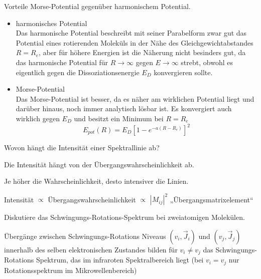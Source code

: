 \documentclass[a5paper,12pt,ngerman,grid=front %
,print
]{kartei}
\begin{document}
	\begin{karte}{
		Vorteile Morse-Potential gegenüber harmonischem Potential.
		}
		
		\begin{itemize}
			\item harmonisches Potential \\
				Das harmonische Potential beschreibt mit seiner Parabelform zwar gut das Potential eines rotierenden Moleküls in der Nähe des Gleichgewichtabstandes $R=R_e$, aber für höhere Energien ist die Näherung nicht besinders gut, da das harmonische Potential für $R \rightarrow \infty$ gegen $ E \rightarrow \infty $ strebt, obwohl es eigentlich gegen die Dissoziationsenergie $E_D$ konvergieren sollte.
				
			\item Morse-Potential \\
				Das Morse-Potential ist besser, da es näher am wirklichen Potential liegt und darüber hinaus, noch immer analytisch lösbar ist. Es konvergiert auch wirklich gegen $E_D$ und besitzt ein Minimum bei $R=R_e$
				$$ E_{pot}(R) = E_D[ 1-e^{ -a( R-R_e ) } ]^2 $$
				
		\end{itemize}
		
	\end{karte}


	\begin{karte}{
		Wovon hängt die Intensität einer Spektrallinie ab?
		}
		
		Die Intensität hängt von der Übergangswahrscheinlichkeit ab.
		
		Je höher die Wahrscheinlichkeit, desto intensiver die Linien.
		
		Intensität $\propto$ Übergangswahrscheinlichkeit $\propto$ $|M_{ij}|^2$ „Übergangsmatrixelement“
		
	\end{karte}


	\begin{karte}{
		Diskutiere das Schwingungs-Rotations-Spektrum bei zweiatomigen Molekülen.
		}
		
		Übergänge zwischen Schwingungs-Rotations Niveaus $ (v_i, \vec{J}_i ) $ und $ (v_j, \vec{J}_j ) $ innerhalb des selben elektronischen Zustandes bilden für $ v_i \neq v_j $ das Schwingungs-Rotations Spektrum, das im infraroten Spektralbereich liegt (bei $ v_i = v_j $ nur Rotationsspektrum im Mikrowellenbereich)
		
	\end{karte}
\end{document}
